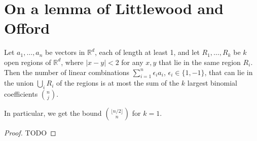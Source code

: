 \chapter{On a lemma of Littlewood and Offord}

\begin{theorem}
  \label{ch25theorem}
  Let $a_1, \dots, a_n$ be vectors in $\mathbb{R}^d$, each of length at least 1,
  and let $R_1, \dots, R_k$ be $k$ open regions of $\mathbb{R}^d$, where $|x - y| < 2$
  for any $x, y$ that lie in the same region $R_i$. Then the number of linear
  combinations $\sum_{i=1}^{n} \epsilon_i a_i$, $\epsilon_i \in \{1, -1\}$,
  that can lie in the union $\bigcup_i R_i$ of the regions is at most the sum of
  the $k$ largest binomial coefficients $\binom{n}{j}$.

  In particular, we get the bound $\binom{\lfloor n/2 \rfloor}{n}$ for $k = 1$.
\end{theorem}
\begin{proof}
  TODO
\end{proof}
